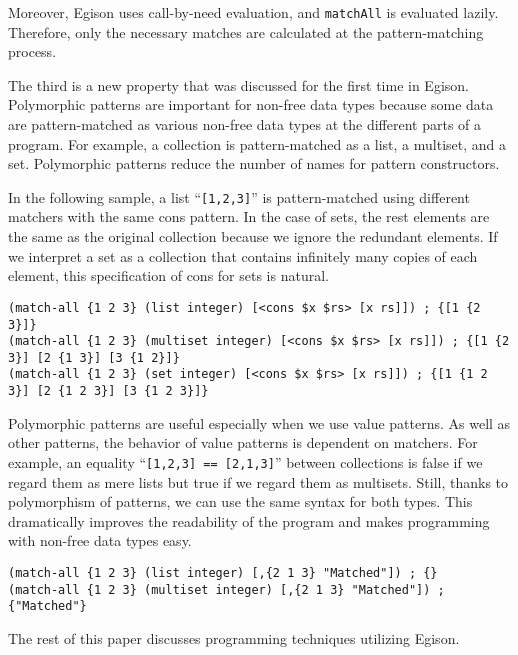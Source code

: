 \documentclass{article}
\begin{document}
Moreover, Egison uses call-by-need evaluation, and \texttt{matchAll} is evaluated lazily.
Therefore, only the necessary matches are calculated at the pattern-matching process.

\medskip

The third is a new property that was discussed for the first time in Egison.
Polymorphic patterns are important for non-free data types because some data are pattern-matched as various non-free data types at the different parts of a program.
For example, a collection is pattern-matched as a list, a multiset, and a set.
Polymorphic patterns reduce the number of names for pattern constructors.

In the following sample, a list ``\texttt{[1,2,3]}'' is pattern-matched using different matchers with the same cons pattern.
In the case of sets, the rest elements are the same as the original collection because we ignore the redundant elements.
If we interpret a set as a collection that contains infinitely many copies of each element, this specification of cons for sets is natural.

\begin{lstlisting}[language=egison]
(match-all {1 2 3} (list integer) [<cons $x $rs> [x rs]]) ; {[1 {2 3}]}
(match-all {1 2 3} (multiset integer) [<cons $x $rs> [x rs]]) ; {[1 {2 3}] [2 {1 3}] [3 {1 2}]}
(match-all {1 2 3} (set integer) [<cons $x $rs> [x rs]]) ; {[1 {1 2 3}] [2 {1 2 3}] [3 {1 2 3}]}
\end{lstlisting}

Polymorphic patterns are useful especially when we use value patterns.
As well as other patterns, the behavior of value patterns is dependent on matchers.
For example, an equality ``\texttt{[1,2,3] == [2,1,3]}'' between collections is false if we regard them as mere lists but true if we regard them as multisets.
Still, thanks to polymorphism of patterns, we can use the same syntax for both types.
This dramatically improves the readability of the program and makes programming with non-free data types easy.

\begin{lstlisting}[language=egison]
(match-all {1 2 3} (list integer) [,{2 1 3} "Matched"]) ; {}
(match-all {1 2 3} (multiset integer) [,{2 1 3} "Matched"]) ; {"Matched"}
\end{lstlisting}

The rest of this paper discusses programming techniques utilizing Egison.

\end{document}
